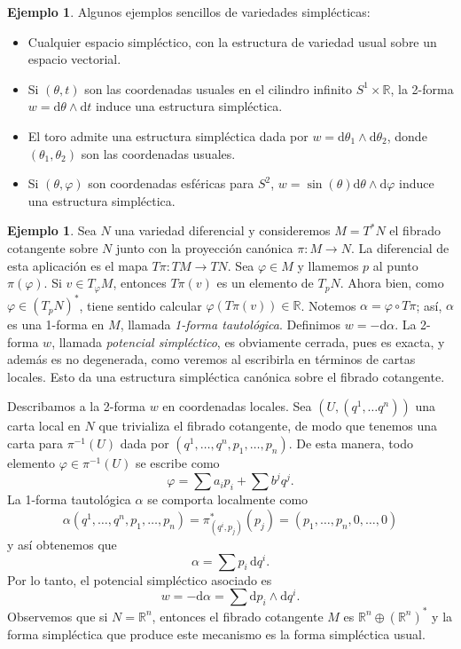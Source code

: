 \documentclass[11pt, a4paper]{article}
\newcommand{\RR}{\mathbb{R}}
\newcommand{\dd}{\mathrm{d}}
\theoremstyle{plain}
\theoremstyle{definition}
\newtheorem{exmp}[prop]{Ejemplo}
\begin{document}
\begin{exmp} Algunos ejemplos sencillos de variedades simplécticas:
\begin{itemize}
\item Cualquier espacio simpléctico, con la estructura de variedad usual sobre un espacio vectorial.
\item Si $(\theta, t)$ son las coordenadas usuales en el cilindro infinito $S^1\times \RR$, la 2-forma $w=\dd \theta\wedge\dd t$ induce una estructura simpléctica.
\item El toro admite una estructura simpléctica dada por $w=\dd \theta_1\wedge\dd \theta_2$, donde $(\theta_1,\theta_2)$ son las coordenadas usuales.
\item Si $(\theta,\varphi)$ son coordenadas esféricas para $S^2$, $w=\sin(\theta)\dd \theta\wedge\dd \varphi$ induce una estructura simpléctica.
\end{itemize}
\end{exmp}
\begin{exmp} Sea $N$ una variedad diferencial y consideremos $M=T^*N$ el fibrado cotangente sobre $N$ junto con la proyección canónica $\pi:M\to N$. La diferencial de esta aplicación es el mapa $T\pi:TM\to TN$. Sea $\varphi\in M$ y llamemos $p$ al punto $\pi(\varphi)$. Si $v\in T_\varphi M$, entonces $T\pi(v)$ es un elemento de $T_pN$. Ahora bien, como $\varphi \in (T_pN)^*$, tiene sentido calcular $\varphi(T\pi(v))\in \RR$. Notemos $\alpha = \varphi\circ T\pi$; así, $\alpha$ es una 1-forma en $M$, llamada \emph{1-forma tautológica}. Definimos $w=-\dd \alpha$. La 2-forma $w$, llamada \emph{potencial simpléctico}, es obviamente cerrada, pues es exacta, y además es no degenerada, como veremos al escribirla en términos de cartas locales. Esto da una estructura simpléctica canónica sobre el fibrado cotangente.

Describamos a la 2-forma $w$ en coordenadas locales. Sea $(U, (q^1,\dots q^n))$ una carta local en $N$ que trivializa el fibrado cotangente, de modo que tenemos una carta para $\pi^{-1}(U)$ dada por $(q^1,\dots,q^n,p_1,\dots,p_n)$. De esta manera, todo elemento $\varphi\in\pi^{-1}(U)$ se escribe como
\[\varphi = \sum a_i p_i + \sum b^jq^j.\]
La 1-forma tautológica $\alpha$ se comporta localmente como
\[\alpha(q^1,\dots,q^n,p_1,\dots,p_n)= \pi^*_{(q^i,p_j)}(p_j) =(p_1,\dots,p_n,0,\dots,0)\]
y así obtenemos que
\[\alpha=\sum p_i\,\dd q^i.\]
Por lo tanto, el potencial simpléctico asociado es
\[w= -\dd \alpha = \sum \dd p_i\wedge \dd q^i.\]
Observemos que si $N=\RR^n$, entonces el fibrado cotangente $M$ es $\RR^n\oplus (\RR^n)^*$ y la forma simpléctica que produce este mecanismo es la forma simpléctica usual.
\end{exmp}
\end{document}
